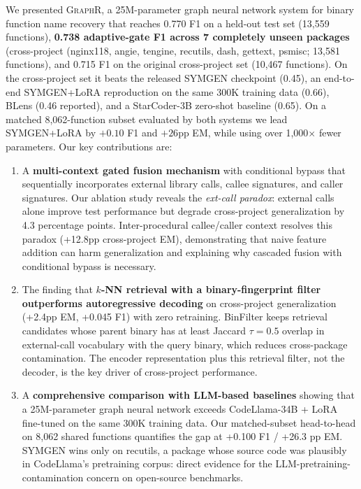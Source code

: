 \documentclass[sigconf,nonacm]{acmart}
\newcommand{\sysname}{\textsc{GraphR}}
\begin{document}
We presented \sysname{}, a 25M-parameter graph neural network system for binary function name recovery that reaches 0.770 F1 on a held-out test set (13{,}559 functions), \textbf{0.738 adaptive-gate F1 across 7 completely unseen packages} (cross-project (nginx118, angie, tengine, recutils, dash, gettext, psmisc; 13{,}581 functions), and 0.715 F1 on the original cross-project set (10{,}467 functions). On the cross-project set it beats the released SYMGEN checkpoint (0.45), an end-to-end SYMGEN+LoRA reproduction on the same 300K training data (0.66), BLens (0.46 reported), and a StarCoder-3B zero-shot baseline (0.65). On a matched 8{,}062-function subset evaluated by both systems we lead SYMGEN+LoRA by $+0.10$ F1 and $+26$pp EM, while using over 1{,}000$\times$ fewer parameters. Our key contributions are:

\begin{enumerate}
    \item A \textbf{multi-context gated fusion mechanism} with conditional bypass that sequentially incorporates external library calls, callee signatures, and caller signatures. Our ablation study reveals the \emph{ext-call paradox}: external calls alone improve test performance but degrade cross-project generalization by 4.3 percentage points. Inter-procedural callee/caller context resolves this paradox (+12.8pp cross-project EM), demonstrating that naive feature addition can harm generalization and explaining why cascaded fusion with conditional bypass is necessary.

    \item The finding that \textbf{$k$-NN retrieval with a binary-fingerprint filter outperforms autoregressive decoding} on cross-project generalization (+2.4pp EM, +0.045 F1) with zero retraining. BinFilter keeps retrieval candidates whose parent binary has at least Jaccard $\tau{=}0.5$ overlap in external-call vocabulary with the query binary, which reduces cross-package contamination. The encoder representation plus this retrieval filter, not the decoder, is the key driver of cross-project performance.

    \item A \textbf{comprehensive comparison with LLM-based baselines} showing that a 25M-parameter graph neural network exceeds CodeLlama-34B + LoRA fine-tuned on the same 300K training data. Our matched-subset head-to-head on 8{,}062 shared functions quantifies the gap at +0.100 F1 / +26.3 pp EM. SYMGEN wins only on recutils, a package whose source code was plausibly in CodeLlama's pretraining corpus: direct evidence for the LLM-pretraining-contamination concern on open-source benchmarks.
\end{enumerate}
\end{document}

